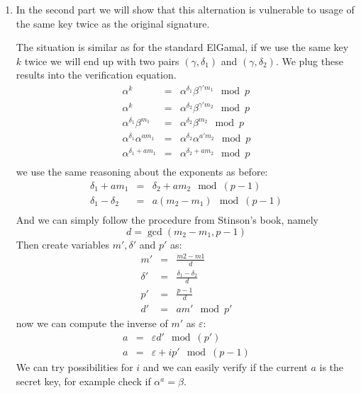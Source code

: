 \documentclass[a4paper,10pt]{article}
\begin{document}
\begin{enumerate}[I]
\item In the second part we will show that this alternation is vulnerable to usage of the same key twice as the original signature.

The situation is similar as for the standard ElGamal, if we use the same key $k$ twice we will end up with two pairs $(\gamma,\delta_1)$ and $(\gamma,\delta_2)$. We plug these results into the verification equation.
\begin{eqnarray*}
\alpha^k &=& \alpha^{\delta_1}\beta^{\gamma'm_1} \mod p\\
\alpha^k &=& \alpha^{\delta_2}\beta^{\gamma'm_2}\mod p\\
\alpha^{\delta_1}\beta^{m_1} &=& \alpha^{\delta_2}\beta^{ m_2}\mod p\\
\alpha^{\delta_1}\alpha^{a m_1} &=& \alpha^{\delta_2}\alpha^{a 'm_2}\mod p\\
\alpha^{\delta_1 + a m_1} &=& \alpha^{\delta_2 + a m_2}\mod p\\
\end{eqnarray*}
we use the same reasoning about the exponents as before:
\begin{eqnarray*}
\delta_1 + a m_1 &=& \delta_2 + a m_2 \mod (p-1)\\
\delta_1 - \delta_2 &=& a (m_2 - m_1) \mod (p-1)\\
\end{eqnarray*}
And we can simply follow the procedure from Stinson's book, namely
$$
d = \gcd(m_2-m_1,p-1)
$$
Then create variables $m',\delta'$ and $p'$ as:
\begin{eqnarray*}
m' &=& \frac{m2-m1}{d} \\
\delta' &=& \frac{\delta_1-\delta_2}{d}\\
p' &=& \frac{p-1}{d}\\
d' &=& am' \mod p'
\end{eqnarray*}
now we can compute the inverse of $m'$ as $\varepsilon$:
\begin{eqnarray*}
a &=& \varepsilon d' \mod(p')\\
a &=& \varepsilon + ip' \mod(p-1)
\end{eqnarray*}
We can try possibilities for $i$ and we can easily verify if the current $a$ is the secret key, for example check if $\alpha^a = \beta$.
\end{enumerate}
\end{document}
